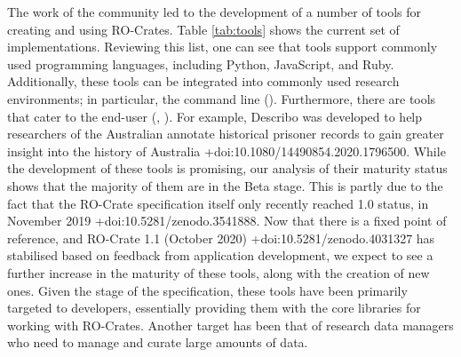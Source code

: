 \markdownRendererInterblockSeparator
{}The work of the community led to the development of a number of tools for creating and using RO-Crates. Table \ref{tab:tools} shows the current set of implementations. Reviewing this list, one can see that tools support commonly used programming languages, including Python, JavaScript, and Ruby. Additionally, these tools can be integrated into commonly used research environments; in particular, the command line (). Furthermore, there are tools that cater to the end-user (, ). For example, Describo was developed to help researchers of the Australian  annotate historical prisoner records to gain greater insight into the history of Australia +{}{}{doi:10.1080/14490854.2020.1796500}. \markdownRendererInterblockSeparator
{}While the development of these tools is promising, our analysis of their maturity status shows that the majority of them are in the Beta stage. This is partly due to the fact that the RO-Crate specification itself only recently reached 1.0 status, in November 2019 +{}{}{doi:10.5281/zenodo.3541888}. Now that there is a fixed point of reference, and RO-Crate 1.1 (October 2020) +{}{}{doi:10.5281/zenodo.4031327} has stabilised based on feedback from application development, we expect to see a further increase in the maturity of these tools, along with the creation of new ones.\markdownRendererInterblockSeparator
{}Given the stage of the specification, these tools have been primarily targeted to developers, essentially providing them with the core libraries for working with RO-Crates. Another target has been that of research data managers who need to manage and curate large amounts of data. \relax